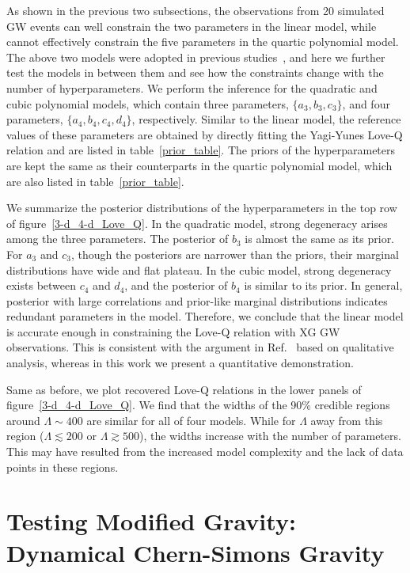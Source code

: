 \documentclass[a4paper,11pt]{article}
\begin{document}
As shown in the previous two subsections, the observations from 20 simulated GW 
events can well constrain the two parameters in the linear model, while cannot 
effectively constrain the five parameters in the quartic polynomial model. The
above two models were adopted in previous studies~\cite{Yagi:2013awa,
Samajdar:2020xrd}, and here we further test the models in between them and see
how the constraints change with the number of hyperparameters. We perform the
inference for the quadratic and cubic polynomial models, which contain three
parameters, $\{a_3, b_3, c_3\}$, and four parameters, $\{a_4, b_4, c_4, d_4\}$,
respectively. Similar to the linear model, the reference values of these
parameters are obtained by directly fitting the Yagi-Yunes Love-Q relation and
are listed in table~\ref{prior_table}. The priors of the hyperparameters are
kept the same as their counterparts in the quartic polynomial model, which are
also listed in table~\ref{prior_table}.

We summarize the posterior distributions of the hyperparameters in the top row
of figure~\ref{3-d_4-d_Love_Q}. In the quadratic model, strong degeneracy arises
among the three parameters. The posterior of $b_3$ is almost the same as its 
prior. For $a_3$ and $c_3$, though the posteriors are narrower than the priors, 
their marginal distributions have wide and flat plateau. In the cubic model, 
strong degeneracy  exists between $c_4$ and $d_4$, and the posterior of $b_4$ is
similar to its prior. In general, posterior with large correlations and 
prior-like marginal distributions indicates redundant parameters in the model. 
Therefore, we conclude that the linear model is accurate enough in constraining 
the Love-Q relation with XG GW observations. This is consistent with the
argument in Ref.~\cite{Samajdar:2020xrd} based on qualitative analysis, whereas
in this work we present a quantitative demonstration. 

Same as before, we plot recovered Love-Q relations in the lower panels of 
figure~\ref{3-d_4-d_Love_Q}. We find that the widths of the 90\% credible
regions around $\Lambda \sim 400$ are similar for all of four models. While for
$\Lambda$ away from this region ($\Lambda \lesssim 200$ or $\Lambda \gtrsim
500$), the widths increase with the number of parameters. This may have resulted
from the increased model complexity and the lack of data points in these
regions. 

\section{Testing Modified Gravity: Dynamical Chern-Simons Gravity}
\label{sec:dCS}
\end{document}
